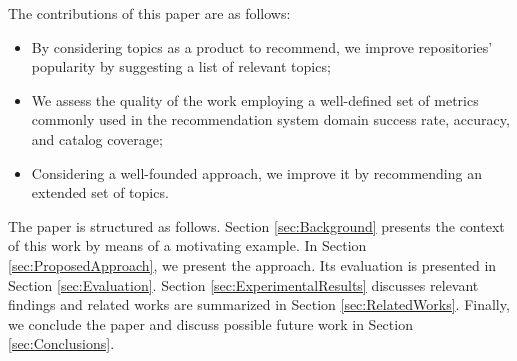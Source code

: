 The contributions of this paper are as follows:
\begin{itemize}
	\item By considering \GH topics as a product to recommend, we improve 
	repositories' popularity by suggesting a list of relevant topics;
	\item We assess the quality of the work employing a well-defined set of 
	metrics commonly used in the recommendation system domain \ie success rate, 
	accuracy, and catalog coverage;
	\item Considering a well-founded approach, we improve it by recommending an 
	extended set of topics.  
\end{itemize}

The paper is structured as follows. Section \ref{sec:Background} presents the 
context of this work by means of a motivating example. In Section 
\ref{sec:ProposedApproach}, we present the \TF approach. Its evaluation is  
presented in Section \ref{sec:Evaluation}. Section 
\ref{sec:ExperimentalResults} discusses relevant findings and related works are 
summarized in  Section \ref{sec:RelatedWorks}. Finally, we conclude the paper 
and discuss possible future work in Section \ref{sec:Conclusions}.
